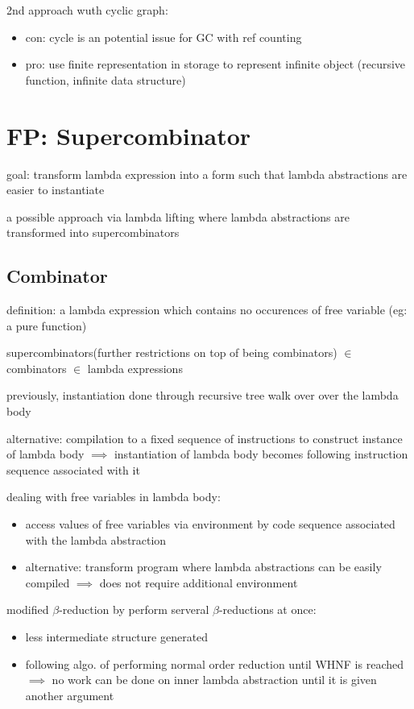 \documentclass[8pt]{extarticle}
\begin{document}
\begin{multicols*}{2}
2nd approach wuth cyclic graph:
\begin{itemize}
\item con: cycle is an potential issue for GC with ref counting
\item pro: use finite representation in storage to represent infinite object (recursive function, infinite data structure)
\end{itemize}

\vfill\null
\columnbreak

\section{FP: Supercombinator}

goal: transform lambda expression into a form such that lambda abstractions are easier to instantiate

a possible approach via lambda lifting where lambda abstractions are transformed into supercombinators

\subsection{Combinator}
definition: a lambda expression which contains no occurences of free variable (eg: a pure function)

supercombinators(further restrictions on top of being combinators) $\in$ combinators $\in$ lambda expressions

previously, instantiation done through recursive tree walk over over the lambda body

alternative: compilation to a fixed sequence of instructions to construct instance of lambda body $\implies$ instantiation of lambda body becomes following instruction sequence associated with it

dealing with free variables in lambda body:
\begin{itemize}
\item access values of free variables via environment by code sequence associated with the lambda abstraction
\item alternative: transform program where lambda abstractions can be easily compiled $\implies$ does not require additional environment
\end{itemize}

modified $\beta$-reduction by perform serveral $\beta$-reductions at once:
\begin{itemize}
\item less intermediate structure generated
\item following algo. of performing normal order reduction until WHNF is reached $\implies$ no work can be done on inner lambda abstraction until it is given another argument
\end{itemize}


\end{multicols*}
\end{document}
